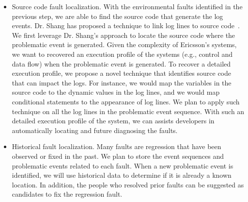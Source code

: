 \begin{enumerate}
\begin{itemize}
		\item Source code fault localization. With the environmental faults identified in the previous step, we are able to find the source code that generate the log events. Dr. Shang has proposed a technique to link log lines to source code~\cite{Shang:2014:ULL:2705615.2706065}. We first leverage Dr. Shang's approach to locate the source code where the problematic event is generated. Given the complexity of Ericsson's systems, we want to recovered an execution profile of the systems (e.g., control and data flow) when the problematic event is generated. To recover a detailed execution profile, we propose a novel technique that identifies source code that can impact the logs. For instance, we would map the variables in the source code to the dynamic values in the log lines, and we would map conditional statements to the appearance of log lines. We plan to apply such technique on all the log lines in the problematic event sequence. With such an detailed execution profile of the system, we can assists developers in automatically locating and future diagnosing the faults.
		
		\item Historical fault localization. Many faults are regression that have been observed or fixed in the past. We plan to store the event sequences and problematic events related to each fault. When a new problematic event is identified, we will use historical data to determine if it is already a known location. In addition, the people who resolved prior faults can be suggested as candidates to fix the regression fault.
		
	\end{itemize}
\end{enumerate}

